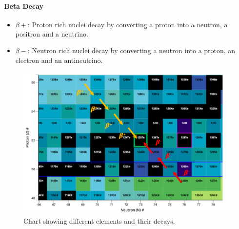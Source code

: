 \paragraph{Beta Decay}
\begin{itemize}
    \item $β+$: Proton rich nuclei decay by converting a proton into a neutron, a positron and a neutrino. 
    \item $β-$: Neutron rich nuclei decay by converting a neutron into a proton, an electron and an antineutrino.
\end{itemize}
\begin{figure}[h!]
\centering
\includegraphics[width = \textwidth]{bet_decay_chart.png}
\caption{Chart showing different elements and their decays.}
\label{fig: bet_decay_chart}
\end{figure}


